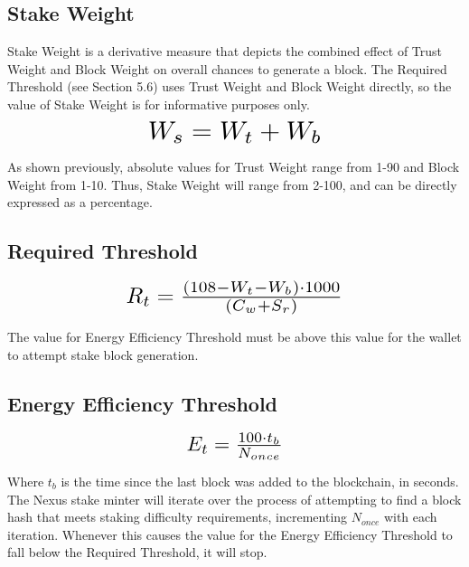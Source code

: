 \documentclass[11pt]{article}
\begin{document}
\subsection{Stake Weight}
Stake Weight is a derivative measure that depicts the combined effect of Trust Weight and Block Weight on overall chances to generate a block. The Required Threshold (see Section 5.6) uses Trust Weight and Block Weight directly, so the value of Stake Weight is for informative purposes only.\\

\begin{equation}
\resizebox{.40\hsize}{!}{$W_{s} = W_{t} + W_{b}$}
\end{equation}

\noindent As shown previously, absolute values for Trust Weight range from 1-90 and Block Weight from 1-10. Thus, Stake Weight will range from 2-100, and can be directly expressed as a percentage.\\


\subsection{Required Threshold}

\begin{equation}
\resizebox{.5\hsize}{!}{$R_{t} = \frac{(108 - W_{t} - W_{b}) \cdot 1000}{(C_{w} + S_{r})}$}
\end{equation}


\noindent The value for Energy Efficiency Threshold must be above this value for the wallet to attempt stake block generation.\\


\subsection{Energy Efficiency Threshold}

\begin{equation}
\resizebox{.22\hsize}{!}{$E_{t} = \frac{100 \cdot t_{b}}{N_{once}}$}
\end{equation}

\noindent Where $t_{b}$ is the time since the last block was added to the blockchain, in seconds.\\

\noindent The Nexus stake minter will iterate over the process of attempting to find a block hash that meets staking difficulty requirements, incrementing $N_{once}$ with each iteration. Whenever this causes the value for the Energy Efficiency Threshold to fall below the Required Threshold, it will stop.\\
\end{document}
